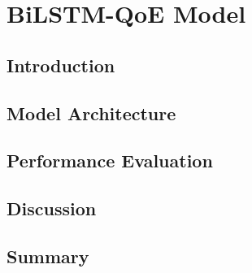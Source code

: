 \chapter{BiLSTM-QoE Model}
\label{ch:BiLSTM}


\renewcommand{\SectionsDir}{Chapter3/Sections}
\renewcommand{\FigsDir}{Chapter3/Figs}
\renewcommand{\TablesDir}{Chapter3/Tables}


\section{Introduction}
\label{BiLSTM:sec:Introduction}


\section{Model Architecture}
\label{BiLSTM:sec:Proposals}


\section{Performance Evaluation}
\label{BiLSTM:sec:Evaluation}


\section{Discussion}
\label{BiLSTM:sec:Discussion}


\section{Summary}
\label{BiLSTM:sec:Summary}
